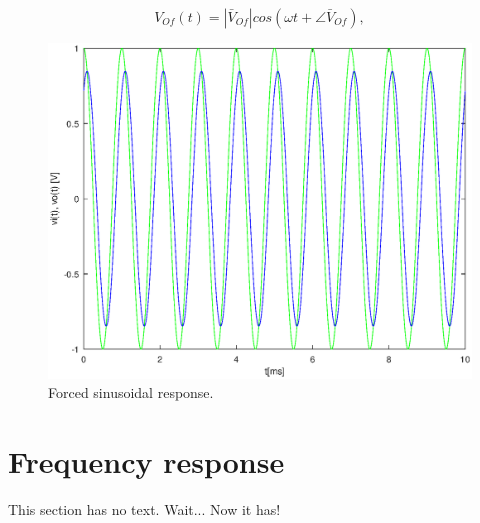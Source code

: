 \begin{equation}
  V_{Of}(t) = |\bar{V}_{Of}| cos(\omega t + \angle \bar{V}_{Of}),
  \label{eq:vo_for}
\end{equation}


\begin{figure}[H] \centering

\includegraphics[width=0.8\linewidth]{forced.eps}
\caption{Forced sinusoidal response.}
\label{fig:forced}
\end{figure}

\section{Frequency response}

This section has no text. Wait... Now it has!


